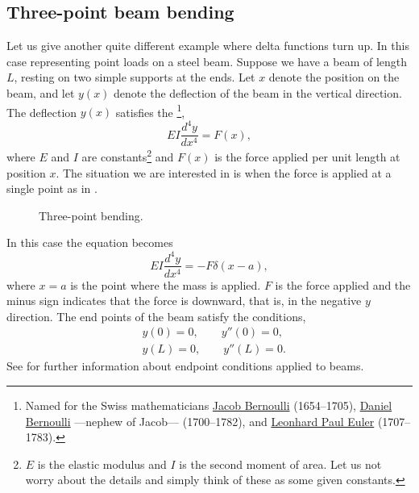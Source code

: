 \subsection{Three-point beam bending}

Let us give another quite different
example where delta functions turn up.  In this case 
representing point loads on a steel beam.  Suppose we have a beam
of length $L$, resting on two simple supports at the ends.  Let $x$ denote
the position on the beam, and let $y(x)$ denote the deflection of the beam in
the vertical direction.  The deflection $y(x)$ satisfies the
\emph{}%
\footnote{Named for the Swiss mathematicians
\href{https://en.wikipedia.org/wiki/Jacob_Bernoulli}{Jacob Bernoulli}
(1654--1705),
\href{https://en.wikipedia.org/wiki/Daniel_Bernoulli}{Daniel Bernoulli}
---nephew of Jacob---
(1700--1782), and
\href{https://en.wikipedia.org/wiki/Euler}{Leonhard Paul Euler}
(1707--1783).},
\begin{equation*}
EI \frac{d^4 y}{dx^4} = F(x) ,
\end{equation*}
where $E$ and $I$ are constants\footnote{$E$ is the elastic modulus and $I$
is the second moment of area.  Let us not worry about the details and simply
think of these as some given constants.} and
$F(x)$ is the force applied per unit length at position $x$.  The situation
we are interested in is when the force is applied at a single point as in
.

\begin{figure}[h!t]
\capstart
\begin{center}
\caption{Three-point bending.\label{lt:beambendingfig}}
\end{center}
\end{figure}

In this case the equation becomes
\begin{equation*}
EI \frac{d^4 y}{dx^4} = -F \delta(x-a) ,
\end{equation*}
where $x=a$ is the point where the mass is applied.  $F$ is the force
applied and the minus sign indicates that the force is downward, that is, in the
negative $y$ direction.  The end points of the
beam satisfy the conditions,
\begin{align*}
& y(0) = 0, \qquad y''(0) = 0, \\
& y(L) = 0, \qquad y''(L) = 0.
\end{align*}
See  for further information about endpoint
conditions applied to beams.


